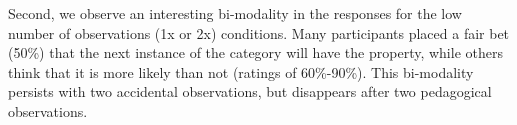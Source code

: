 \documentclass[10pt,letterpaper]{article}
\newcommand{\mht}[1]{\textcolor{Blue}{[mht: #1]}}
\begin{document}
Second, we observe an interesting bi-modality in the responses for the low number of observations (1x or 2x) conditions. 
Many participants placed a fair bet (50\%) that the next instance of the category will have the property, while others think that it is more likely than not (ratings of 60\%-90\%). 
This bi-modality persists with two accidental observations, but disappears after two pedagogical observations.








%

\end{document}
